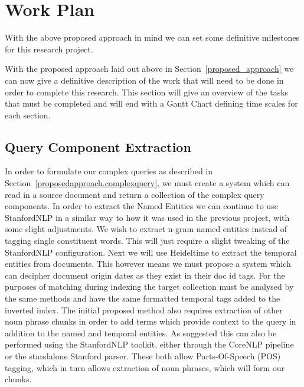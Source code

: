 \documentclass{mprop}
\begin{document}
\section{Work Plan} \label{work_plan}
With the above proposed approach in mind we can set some definitive milestones for this research project.

With the proposed approach laid out above in Section~\ref{proposed_approach} we can now give a definitive description of the work that will need to be done in order to complete this research. This section will give an overview of the tasks that must be completed and will end with a Gantt Chart defining time scales for each section.

\subsection{Query Component Extraction}
In order to formulate our complex queries as described in Section~\ref{proposedapproach.complexquery}, we must create a system which can read in a source document and return a collection of the complex query components. In order to extract the Named Entities we can continue to use StanfordNLP in a similar way to how it was used in the previous project, with some slight adjustments. We wish to extract n-gram named entities instead of tagging single constituent words. This will just require a slight tweaking of the StanfordNLP configuration. Next we will use Heideltime to extract the temporal entities from documents. This however means we must propose a system which can decipher document origin dates as they exist in their doc id tags. For the purposes of matching during indexing the target collection must be analysed by the same methods and have the same formatted temporal tags added to the inverted index. The initial proposed method also requires extraction of other noun phrase chunks in order to add terms which provide context to the query in addition to the named and temporal entities. As suggested this can also be performed using the StanfordNLP toolkit, either through the CoreNLP pipeline or the standalone Stanford parser. These both allow Parts-Of-Speech (POS) tagging, which in turn allows extraction of noun phrases, which will form our chunks.
\end{document}

